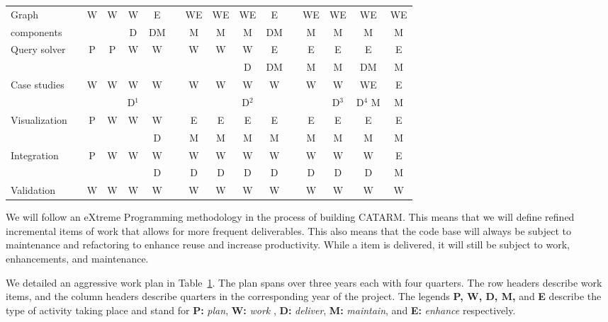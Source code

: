 \documentclass[12pt]{article}
\begin{document}
\begin{table}[bt]
\begin{tabular}{lp{.1cm}ccccp{.1cm}ccccp{.1cm}cccc}
Graph  & & 
W & W & W & E & & WE & WE & WE & E & & WE & WE & WE & WE \\ 
components & & 
 &  & D & DM & & M & M & M & DM & & M & M & M & M \\ \hline

\multirow{2}{*}{Query solver} & & 
P & P & W & W & & W & W & W & E & & E & E & E & E \\ 
& & 
 &  &  &  & &  &  & D & DM & & M & M & DM & M \\ \hline

\multirow{2}{*}{Case studies} & & 
W & W & W & W & & W & W & W & W & & W & W & WE & E \\ 
& & 
 &  & D$^1$ &  & &  &  & D$^2$ &  & &  & D$^3$ & D$^4$ M & M \\ \hline

\multirow{2}{*}{Visualization} & & 
P & W & W & W & & E & E & E & E & & E & E & E & E \\ 
& & 
 &  &  & D & & M & M & M & M & & M & M & M & M \\ \hline

\multirow{2}{*}{Integration} & & 
P & W & W & W & & W & W & W & W & & W & W & W & E \\ 
& & 
 &  &  & D & & D & D & D & D & & D & D & D & M \\  \hline

Validation & & 
W & W & W & W & & W & W & W & W & & W & W & W & W \\  \bottomrule
\end{tabular}
\normalsize
\label{t:workplan}
\end{table}

We will follow an eXtreme Programming 
methodology in the process of building CATARM.
This means that we will define refined incremental items of 
work that allows for more frequent deliverables. 
This also means that the code base will always be subject
to maintenance and refactoring to enhance reuse and 
increase productivity. 
While a item is delivered, it will still be subject to work,
enhancements, and maintenance. 

We detailed an aggressive work plan in Table~\ref{t:workplan}. 
The plan spans over three years each with four quarters. 
The row headers describe work items, and the column headers
describe quarters in the corresponding year of the project.
The legends {\bf P, W, D, M, } 
and {\bf E} 
describe the type of activity taking place 
and stand for 
{\bf P:} {\em plan}, 
{\bf W:} {\em work }, 
{\bf D:} {\em deliver}, 
{\bf M:}  {\em maintain}, 
and 
{\bf E: } {\em enhance} respectively. 
\end{document}
